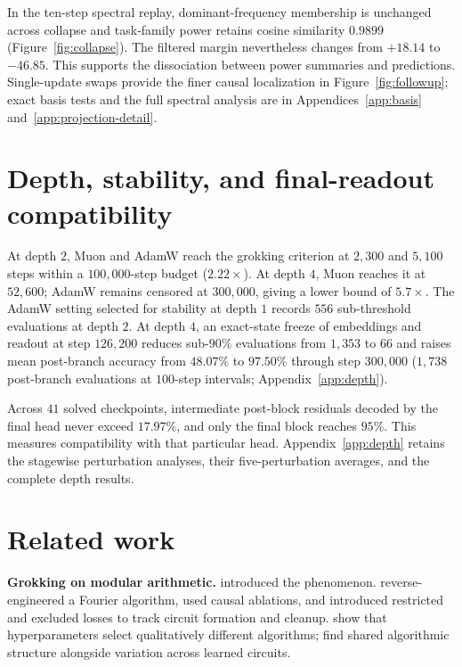 \documentclass{article}
\begin{document}
In the ten-step spectral replay, dominant-frequency membership is unchanged across collapse and task-family power retains cosine similarity $0.9899$ (Figure~\ref{fig:collapse}). The filtered margin nevertheless changes from $+18.14$ to $-46.85$. This supports the dissociation between power summaries and predictions. Single-update swaps provide the finer causal localization in Figure~\ref{fig:followup}; exact basis tests and the full spectral analysis are in Appendices~\ref{app:basis} and~\ref{app:projection-detail}.

\section{Depth, stability, and final-readout compatibility}
\label{sec:depth}

At depth $2$, Muon and AdamW reach the grokking criterion at $2{,}300$ and $5{,}100$ steps within a $100{,}000$-step budget ($2.22\times$). At depth $4$, Muon reaches it at $52{,}600$; AdamW remains censored at $300{,}000$, giving a lower bound of $5.7\times$. The AdamW setting selected for stability at depth $1$ records $556$ sub-threshold evaluations at depth $2$. At depth $4$, an exact-state freeze of embeddings and readout at step $126{,}200$ reduces sub-$90\%$ evaluations from $1{,}353$ to $66$ and raises mean post-branch accuracy from $48.07\%$ to $97.50\%$ through step $300{,}000$ ($1{,}738$ post-branch evaluations at $100$-step intervals; Appendix~\ref{app:depth}).

Across $41$ solved checkpoints, intermediate post-block residuals decoded by the final head never exceed $17.97\%$, and only the final block reaches $95\%$. This measures compatibility with that particular head. Appendix~\ref{app:depth} retains the stagewise perturbation analyses, their five-perturbation averages, and the complete depth results.

\section{Related work}
\label{sec:related}

\textbf{Grokking on modular arithmetic.} \citet{power2022grokking} introduced the phenomenon. \citet{nanda2023progress} reverse-engineered a Fourier algorithm, used causal ablations, and introduced restricted and excluded losses to track circuit formation and cleanup. \citet{zhong2023clock} show that hyperparameters select qualitatively different algorithms; \citet{chughtai2023toy} find shared algorithmic structure alongside variation across learned circuits.
\end{document}
